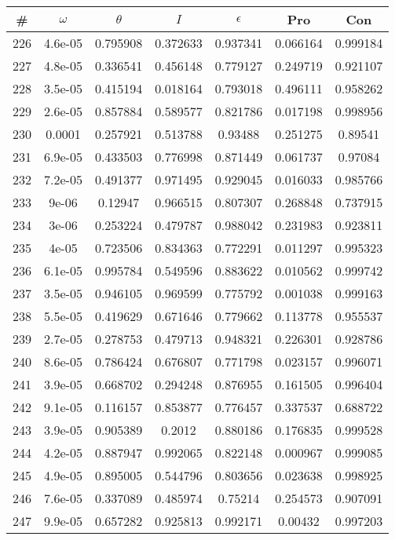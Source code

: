 \newpage
\begin{table}
\begin{tabular}{c|c|c|c|c|c|c}
\# & $\omega$ & $\theta$ & $I$ & $\epsilon$ & Pro & Con\\
\hline
226 & 4.6e-05 & 0.795908 & 0.372633 & 0.937341 & 0.066164 & 0.999184\\
227 & 4.8e-05 & 0.336541 & 0.456148 & 0.779127 & 0.249719 & 0.921107\\
228 & 3.5e-05 & 0.415194 & 0.018164 & 0.793018 & 0.496111 & 0.958262\\
229 & 2.6e-05 & 0.857884 & 0.589577 & 0.821786 & 0.017198 & 0.998956\\
230 & 0.0001 & 0.257921 & 0.513788 & 0.93488 & 0.251275 & 0.89541\\
231 & 6.9e-05 & 0.433503 & 0.776998 & 0.871449 & 0.061737 & 0.97084\\
232 & 7.2e-05 & 0.491377 & 0.971495 & 0.929045 & 0.016033 & 0.985766\\
233 & 9e-06 & 0.12947 & 0.966515 & 0.807307 & 0.268848 & 0.737915\\
234 & 3e-06 & 0.253224 & 0.479787 & 0.988042 & 0.231983 & 0.923811\\
235 & 4e-05 & 0.723506 & 0.834363 & 0.772291 & 0.011297 & 0.995323\\
236 & 6.1e-05 & 0.995784 & 0.549596 & 0.883622 & 0.010562 & 0.999742\\
237 & 3.5e-05 & 0.946105 & 0.969599 & 0.775792 & 0.001038 & 0.999163\\
238 & 5.5e-05 & 0.419629 & 0.671646 & 0.779662 & 0.113778 & 0.955537\\
239 & 2.7e-05 & 0.278753 & 0.479713 & 0.948321 & 0.226301 & 0.928786\\
240 & 8.6e-05 & 0.786424 & 0.676807 & 0.771798 & 0.023157 & 0.996071\\
241 & 3.9e-05 & 0.668702 & 0.294248 & 0.876955 & 0.161505 & 0.996404\\
242 & 9.1e-05 & 0.116157 & 0.853877 & 0.776457 & 0.337537 & 0.688722\\
243 & 3.9e-05 & 0.905389 & 0.2012 & 0.880186 & 0.176835 & 0.999528\\
244 & 4.2e-05 & 0.887947 & 0.992065 & 0.822148 & 0.000967 & 0.999085\\
245 & 4.9e-05 & 0.895005 & 0.544796 & 0.803656 & 0.023638 & 0.998925\\
246 & 7.6e-05 & 0.337089 & 0.485974 & 0.75214 & 0.254573 & 0.907091\\
247 & 9.9e-05 & 0.657282 & 0.925813 & 0.992171 & 0.00432 & 0.997203\\

\end{tabular}
\end{table}
